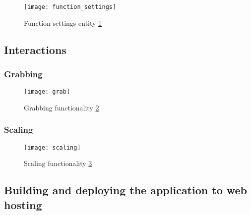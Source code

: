 \begin{figure}[ht!]
\centering
\texttt{[image: function\_settings]}
\caption{Function settings entity \ref{r:4}}
\label{r:4}
\end{figure}

\subsection{Interactions}

\subsubsection{Grabbing}

\begin{figure}[ht!]
\centering
\texttt{[image: grab]}
\caption{Grabbing functionality \ref{r:5}}
\label{r:5}
\end{figure}

\subsubsection{Scaling}

\begin{figure}[ht!]
\centering
\texttt{[image: scaling]}
\caption{Scaling functionality \ref{r:6}}
\label{r:6}
\end{figure}

\subsection{Building and deploying the application to web hosting}


